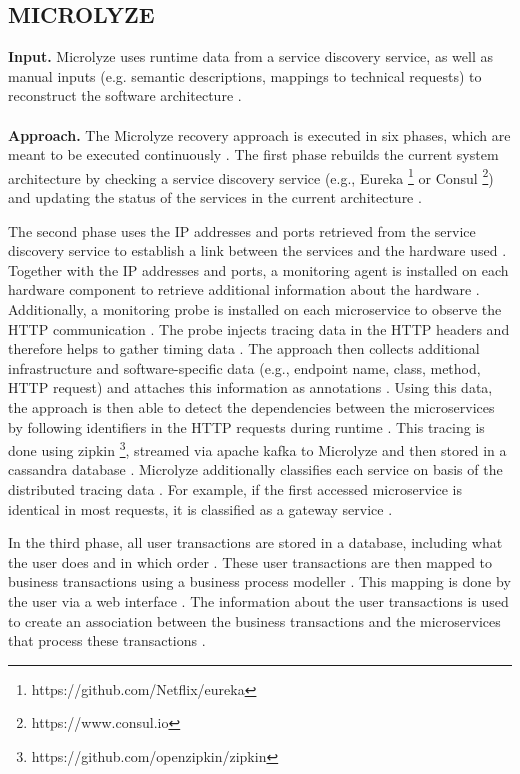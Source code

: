 \subsection{MICROLYZE}
\label{sec:Results:Microlyze}
\textbf{Input.}
Microlyze uses runtime data from a service discovery service, as well as manual inputs (e.g. semantic descriptions, mappings to technical requests) to reconstruct the software architecture \cite{Kleehaus2018}.
\\ \\
\textbf{Approach.}
The Microlyze recovery approach is executed in six phases, which are meant to be executed continuously \cite{Kleehaus2018}.
The first phase rebuilds the current system architecture by checking a service discovery service (e.g., Eureka \footnote{https://github.com/Netflix/eureka} or Consul \footnote{https://www.consul.io}) and updating the status of the services in the current architecture \cite{Kleehaus2018}.

The second phase uses the IP addresses and ports retrieved from the service discovery service to establish a link between the services and the hardware used \cite{Kleehaus2018}.
Together with the IP addresses and ports, a monitoring agent is installed on each hardware component to retrieve additional information about the hardware \cite{Kleehaus2018}.
Additionally, a monitoring probe is installed on each microservice to observe the HTTP communication \cite{Kleehaus2018}.
The probe injects tracing data in the HTTP headers and therefore helps to gather timing data \cite{Kleehaus2018}.
The approach then collects additional infrastructure and software-specific data (e.g., endpoint name, class, method, HTTP request) and attaches this information as annotations \cite{Kleehaus2018}.
Using this data, the approach is then able to detect the dependencies between the microservices by following identifiers in the HTTP requests during runtime \cite{Kleehaus2018}.
This tracing is done using zipkin \footnote{https://github.com/openzipkin/zipkin}, streamed via apache kafka to Microlyze and then stored in a cassandra database \cite{Kleehaus2018}.
Microlyze additionally classifies each service on basis of the distributed tracing data \cite{Kleehaus2018}.
For example, if the first accessed microservice is identical in most requests, it is classified as a gateway service \cite{Kleehaus2018}.

In the third phase, all user transactions are stored in a database, including what the user does and in which order \cite{Kleehaus2018}.
These user transactions are then mapped to business transactions using a business process modeller \cite{Kleehaus2018}.
This mapping is done by the user via a web interface \cite{Kleehaus2018}.
The information about the user transactions is used to create an association between the business transactions and the microservices that process these transactions \cite{Kleehaus2018}.


